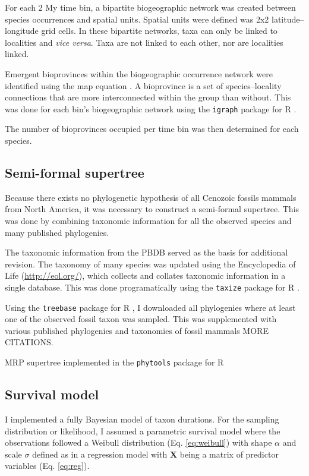 \documentclass[12pt,letterpaper]{article}
\begin{document}
For each 2 My time bin, a bipartite biogeographic network was created between species occurrences and spatial units. Spatial units were defined was 2x2 latitude--longitude grid cells. In these bipartite networks, taxa can only be linked to localities and \textit{vice versa}. Taxa are not linked to each other, nor are localities linked. 

Emergent bioprovinces within the biogeographic occurrence network were identified using the map equation \citep{Rosvall2008,Rosvall2009a}. A bioprovince is a set of species--locality connections that are more interconnected within the group than without. This was done for each bin's biogeographic network using the \texttt{igraph} package for R \citep{csardi2006igraph,2014language}. 

The number of bioprovinces occupied per time bin was then determined for each species.


\subsection{Semi-formal supertree}

Because there exists no phylogenetic hypothesis of all Cenozoic fossils mammals from North America, it was necessary to construct a semi-formal supertree. This was done by combining taxonomic information for all the observed species and many published phylogenies.

The taxonomic information from the PBDB served as the basis for additional revision. The taxonomy of many species was updated using the Encyclopedia of Life (\url{http://eol.org/}), which collects and collates taxonomic information in a single database. This was done programatically using the \texttt{taxize} package for R \citep{2013taxize}.

Using the \texttt{treebase} package for R \citep{boettiger2014treebase}, I downloaded all phylogenies where at least one of the observed fossil taxon was sampled. This was supplemented with various published phylogenies and taxonomies of fossil mammals \citep{Raia2012f,Janis1998,Janis2008} MORE CITATIONS.


MRP supertree implemented in the \texttt{phytools} package for R \citep{revell2012phytools}


\subsection{Survival model}

I implemented a fully Bayesian model of taxon durations. For the sampling distribution or likelihood, I assumed a parametric survival model where the observations followed a Weibull distribution (Eq. \ref{eq:weibull}) with shape \(\alpha\) and scale \(\sigma\) defined as in a regression model with \(\mathbf{X}\) being a matrix of predictor variables (Eq. \ref{eq:reg}).
\end{document}
